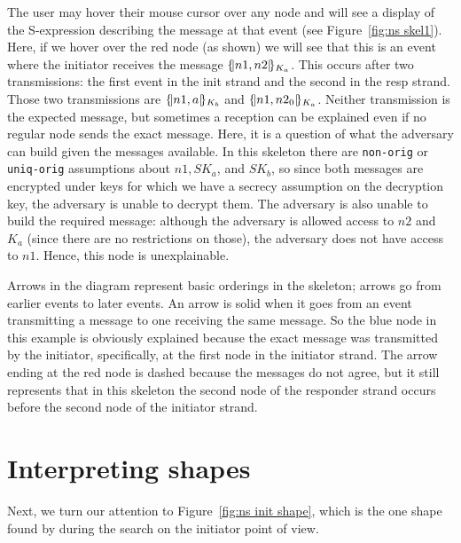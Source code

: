  The user may hover their mouse cursor
over any node and will see a display of the S-expression describing
the message at that event (see Figure~\ref{fig:ns skel1}). Here, if we
hover over the red node (as shown) we will see that this is an event where the
initiator receives the message $\{\!|n1, n2|\!\}_{K_a}$.  This occurs after
two transmissions: the first event in the init strand and the second
in the resp strand.  Those two transmissions are $\{\!|n1, a|\!\}_{K_b}$
and $\{\!|n1, n2_0|\!\}_{K_a}$.  Neither transmission is the expected
message, but sometimes a reception can be explained even if no regular
node sends the exact message.  Here, it is a question of what the
adversary can build given the messages available.  In this skeleton
there are \texttt{non-orig} or \texttt{uniq-orig} assumptions about
$n1, SK_a$, and $SK_b$, so since both messages are encrypted under
keys for which we have a secrecy assumption on the decryption key, the
adversary is unable to decrypt them.  The adversary is also unable to
build the required message: although the adversary is allowed access
to $n2$ and $K_a$ (since there are no restrictions on those), the
adversary does not have access to $n1$.  Hence, this node is
unexplainable.

Arrows in the diagram represent basic orderings in the skeleton;
arrows go from earlier events to later events.  An arrow is solid when
it goes from an event transmitting a message to one receiving the same
message. So the blue node in this example is obviously explained
because the exact message was transmitted by the initiator,
specifically, at the first node in the initiator strand.  The arrow
ending at the red node is dashed because the messages do not agree,
but it still represents that in this skeleton the second node of the
responder strand occurs before the second node of the initiator strand.

\section{Interpreting shapes}

Next, we turn our attention to Figure~\ref{fig:ns init shape}, which
is the one shape found by {\cpsa} during the search on the initiator
point of view.

